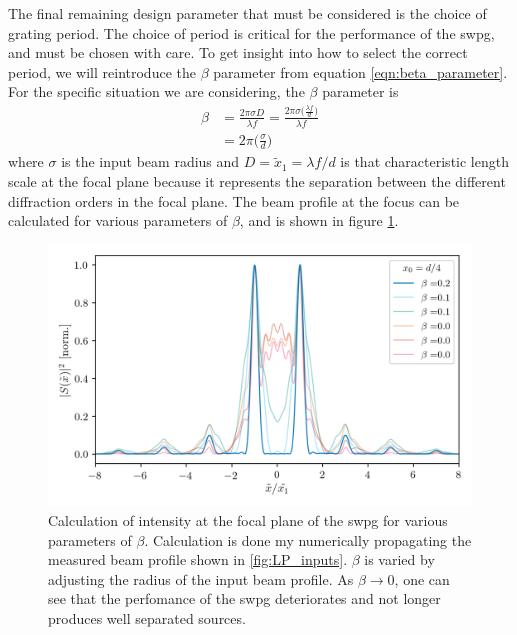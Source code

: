 The final remaining design parameter that must be considered is the choice of grating period. The choice of period is critical for the performance of the \gls{swpg}, and must be chosen with care.  To get insight into how to select the correct period, we will reintroduce the $\beta$ parameter from equation \ref{eqn:beta_parameter}.  For the specific situation we are considering, the $\beta$ parameter is
\begin{equation}
\label{eqn:beta_swpg}
	\begin{aligned}
		\beta &= \frac{2\pi \sigma D}{\lambda f} = \frac{2\pi\sigma\big(\frac{\lambda f}{d}\big)}{\lambda f}\\
		&= 2\pi\bigg(\frac{\sigma}{d}\bigg)
	\end{aligned}
\end{equation}
where $\sigma$ is the input beam radius and $D=\tilde{x}_1=\lambda f /d$ is that characteristic length scale at the focal plane because it represents the separation between the different diffraction orders in the focal plane.  The beam profile at the focus can be calculated for various parameters of $\beta$, and is shown in figure \ref{fig:intensity_vs_beta}.
\begin{figure}
	\centering
	\includegraphics[width=1.0\textwidth]{figures/Two_source/focus_intensity_beta_sigma.png}
	\caption{Calculation of intensity at the focal plane of the \gls{swpg} for various parameters of $\beta$.  Calculation is done my numerically propagating the measured beam profile shown in \ref{fig:LP_inputs}.  $\beta$ is varied by adjusting the radius of the input beam profile.  As $\beta\rightarrow0$, one can see that the perfomance of the \gls{swpg} deteriorates and not longer produces well separated sources.}
	\label{fig:intensity_vs_beta}
\end{figure}
